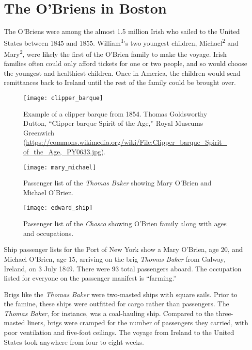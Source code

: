 \chapter{The O'Briens in Boston}

The O'Briens were among the almost 1.5 million Irish who sailed to the United States between 1845 and 1855.\cite{Miller:291} William\textsuperscript{1}'s two youngest children, Michael\textsuperscript{2} and Mary\textsuperscript{2}, were likely the first of the O'Brien family to make the voyage. Irish families often could only afford tickets for one or two people, and so would choose the youngest and healthiest children.\cite{Miller:292} Once in America, the children would send remittances back to Ireland until the rest of the family could be brought over.\cite{Miller:295}

\begin{figure}
	\centering
	\texttt{[image: clipper\_barque]}
	\caption{Example of a clipper barque from 1854. Thomas Goldsworthy Dutton, ``Clipper barque Spirit of the Age,'' Royal Museums Greenwich (\url{https://commons.wikimedia.org/wiki/File:Clipper_barque_Spirit_of_the_Age,_PY0633.jpg}).}
\end{figure}


\begin{figure}
	\centering
	\texttt{[image: mary\_michael]}
	\caption{Passenger list of the \textit{Thomas Baker} showing Mary O'Brien and Michael O'Brien.\cite{ThomasBaker}}
\end{figure}

\begin{figure}
	\centering
	\texttt{[image: edward\_ship]}
	\caption{Passenger list of the \textit{Chasca} showing O'Brien family along with ages and occupations.\cite{Chascay}}
\end{figure}

Ship passenger lists for the Port of New York show a Mary O'Brien, age 20, and Michael O'Brien, age 15, arriving on the brig \textit{Thomas Baker} from Galway, Ireland, on 3 July 1849. There were 93 total passengers aboard. The occupation listed for everyone on the passenger manifest is ``farming.''\cite{ThomasBaker}

Brigs like the \textit{Thomas Baker} were two-masted ships with square sails.\cite{OHanlon:35} Prior to the famine, these ships were outfitted for cargo rather than passengers.\cite{Laxton:9} The \textit{Thomas Baker}, for instance, was a coal-hauling ship.\cite{MorningAdvertiser} Compared to the three-masted liners, brigs were cramped for the number of passengers they carried, with poor ventilation and five-foot ceilings.\cite{OHanlon:33} The voyage from Ireland to the United States took anywhere from four to eight weeks.


